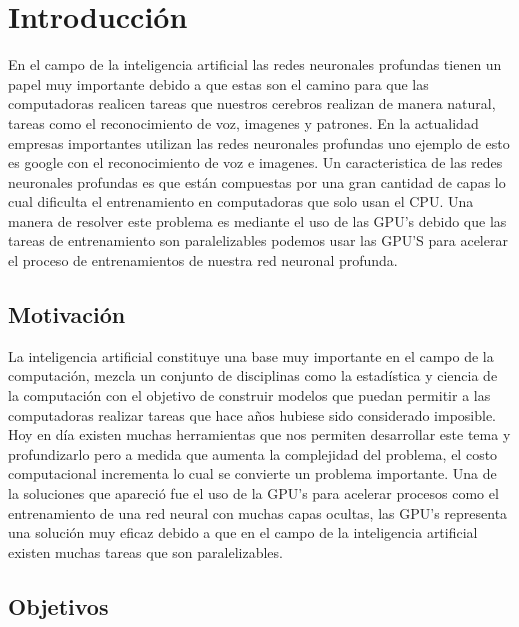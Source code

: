 \chapter{Introducción}
En el campo de la inteligencia artificial las redes neuronales profundas tienen un papel muy importante debido a que estas son el camino para que las computadoras realicen tareas que nuestros cerebros realizan de manera natural, tareas como el reconocimiento de voz, imagenes y patrones. En la actualidad empresas importantes utilizan las redes neuronales profundas uno ejemplo de esto es google con el reconocimiento de voz e imagenes. Un caracteristica de las redes neuronales profundas es que están compuestas por una gran cantidad de capas lo cual dificulta el entrenamiento en computadoras que solo usan el CPU. Una manera de resolver este problema es mediante el uso de las GPU's debido que las tareas de entrenamiento son paralelizables podemos usar las GPU'S para acelerar el proceso de entrenamientos de nuestra red neuronal profunda.

\section{Motivación}
La inteligencia artificial constituye una base muy importante en el campo de la computación, mezcla un conjunto de disciplinas como la estadística y ciencia de la computación con el objetivo de construir modelos que puedan permitir a las computadoras realizar tareas que hace años hubiese sido considerado imposible. Hoy en día existen muchas herramientas que nos permiten desarrollar este tema y profundizarlo pero a medida que aumenta la complejidad del problema, el costo computacional incrementa lo cual se convierte un problema importante. Una de la soluciones que apareció fue el uso de la GPU's para acelerar procesos como el entrenamiento de una red neural con muchas capas ocultas, las GPU's representa una solución muy eficaz debido a que en el campo de la inteligencia artificial existen muchas tareas que son paralelizables.


\section{Objetivos}

